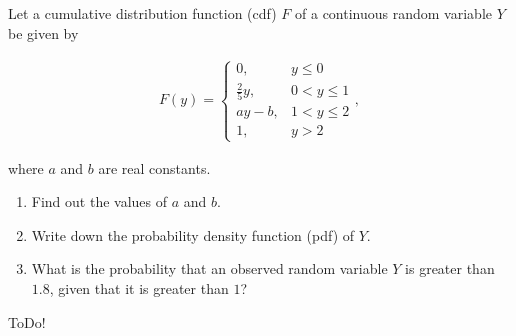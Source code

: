 
\begin{exercise}

Let a cumulative distribution function (cdf) $F$ of a continuous random variable $Y$ be given by

\begin{align*}
    F(y)
    =
    \begin{cases}
        0,             & y \leq 0     \\
        \frac{2}{5} y, & 0 < y \leq 1 \\
        a y - b,       & 1 < y \leq 2 \\
        1,             & y > 2
    \end{cases},
\end{align*}

where $a$ and $b$ are real constants.

\begin{enumerate}[label = (\alph*)]
    \item Find out the values of $a$ and $b$.
    \item Write down the probability density function (pdf) of $Y$.
    \item What is the probability that an observed random variable $Y$ is greater than $1.8$, given that it is greater than $1$?    
\end{enumerate}

\end{exercise}


\begin{solution}

ToDo!

\end{solution}

